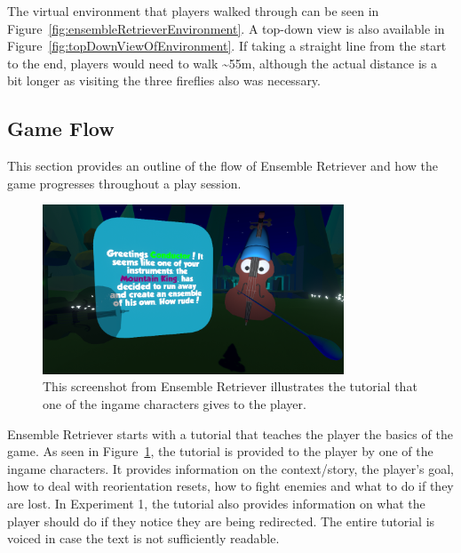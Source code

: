 The virtual environment that players walked through can be seen in Figure~\ref{fig:ensembleRetrieverEnvironment}. A top-down view is also available in Figure~\ref{fig:topDownViewOfEnvironment}. If taking a straight line from the start to the end, players would need to walk \textasciitilde55m, although the actual distance is a bit longer as visiting the three fireflies also was necessary. 

\subsection{Game Flow}
This section provides an outline of the flow of Ensemble Retriever and how the game progresses throughout a play session. 

\begin{figure}[tbph]
    \centering
    \includegraphics[width=0.8\textwidth]{figures/screenshots/Tutorial.png}
    \caption[Screenshot of the Tutorial in Ensemble Retriever]{This screenshot from Ensemble Retriever illustrates the tutorial that one of the ingame characters gives to the player.}
    \label{fig:tutorial}
\end{figure}

Ensemble Retriever starts with a tutorial that teaches the player the basics of the game. As seen in Figure~\ref{fig:tutorial}, the tutorial is provided to the player by one of the ingame characters. It provides information on the context/story, the player's goal, how to deal with reorientation resets, how to fight enemies and what to do if they are lost. In Experiment 1, the tutorial also provides information on what the player should do if they notice they are being redirected. The entire tutorial is voiced in case the text is not sufficiently readable.

